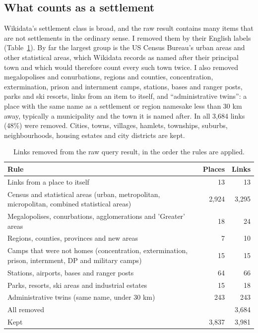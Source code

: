 \documentclass[11pt,a4paper]{article}
\begin{document}
\subsection{What counts as a settlement}
Wikidata's settlement class is broad, and the raw result contains many items that are not settlements in the ordinary sense. I removed them by their English labels (Table~\ref{tab:excl}). By far the largest group is the US Census Bureau's urban areas and other statistical areas, which Wikidata records as named after their principal town and which would therefore count every such town twice. I also removed megalopolises and conurbations, regions and counties, concentration, extermination, prison and internment camps, stations, bases and ranger posts, parks and ski resorts, links from an item to itself, and ``administrative twins'': a place with the same name as a settlement or region namesake less than 30 km away, typically a municipality and the town it is named after. In all 3,684 links (48\%) were removed. Cities, towns, villages, hamlets, townships, suburbs, neighbourhoods, housing estates and city districts are kept.

\begin{table}[tbp]\centering\small\caption{Links removed from the raw query result, in the order the rules are applied.}\label{tab:excl}\begin{tabular}{p{10.5cm}rr}\toprule Rule & Places & Links\\\midrule
Links from a place to itself & 13 & 13\\
Census and statistical areas (urban, metropolitan, micropolitan, combined statistical areas) & 2,924 & 3,295\\
Megalopolises, conurbations, agglomerations and 'Greater' areas & 18 & 24\\
Regions, counties, provinces and new areas & 7 & 10\\
Camps that were not homes (concentration, extermination, prison, internment, DP and military camps) & 15 & 15\\
Stations, airports, bases and ranger posts & 64 & 66\\
Parks, resorts, ski areas and industrial estates & 15 & 18\\
Administrative twins (same name, under 30 km) & 243 & 243\\
\midrule All removed & & 3,684\\ Kept & 3,837 & 3,981\\\bottomrule\end{tabular}\end{table}
\end{document}
